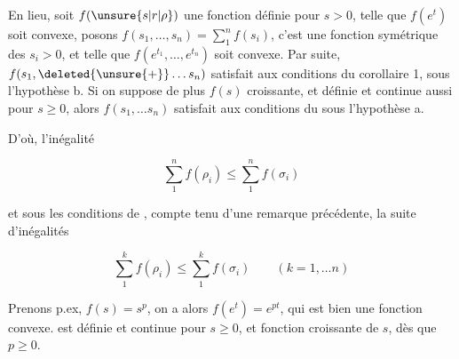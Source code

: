 
En  lieu, soit $f(\unsure{s|r|\rho})$ une fonction définie pour $s>0$, telle que $f(e^t)$ soit convexe, posons $f(s_1,\ldots,s_n)=\sum_1^n f(s_i)$, c'est une fonction symétrique des  $s_i>0$, et telle que $f(e^{t_1},\ldots,e^{t_n})$ soit convexe. Par suite,  $f(s_1,\deleted{\unsure{+}}\ldots s_n)$ satisfait aux conditions du corollaire 1, sous l'hypothèse b. Si on suppose de plus $f(s)$ croissante, et définie et continue aussi pour $s\geq0$, alors $f(s_1,\ldots s_n)$ satisfait  aux conditions du  sous l'hypothèse a.

D'où,    l'inégalité

\[
\sum_1^n f(\rho_i)\leq\sum_1^n f(\sigma_i)\tag*{(13)}
\]

et sous les conditions de , compte tenu d'une remarque précédente, la suite d'inégalités

\[
\sum_1^k f(\rho_i)\leq\sum_1^k f(\sigma_i)\qquad(k=1,\ldots n)\tag*{(14)}
\]

Prenons p.ex,  $f(s)=s^p$,  on a alors $f(e^t)=e^{pt}$, qui est bien une fonction convexe.  est définie et  continue pour $s\geq0$, et  fonction croissante de $s$, dès que $p\geq0$. 

